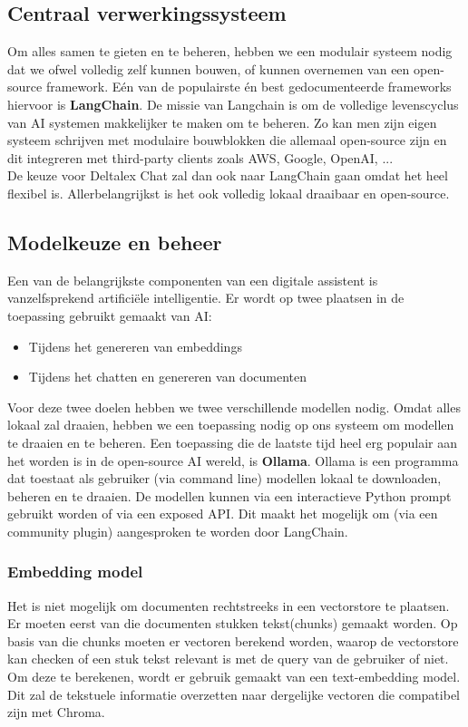 \subsection{Centraal verwerkingssysteem}
Om alles samen te gieten en te beheren, hebben we een modulair systeem nodig dat we ofwel volledig zelf kunnen bouwen, of kunnen overnemen van een open-source framework. 
Eén van de populairste én best gedocumenteerde frameworks hiervoor is \textbf{LangChain}. 
De missie van Langchain is om de volledige levenscyclus van AI systemen makkelijker te maken om te beheren. 
Zo kan men zijn eigen systeem schrijven met modulaire bouwblokken die allemaal open-source zijn en dit integreren met third-party clients zoals AWS, Google, OpenAI, ... \\ 

De keuze voor Deltalex Chat zal dan ook naar LangChain gaan omdat het heel flexibel is. 
Allerbelangrijkst is het ook volledig lokaal draaibaar en open-source. 

\newpage
\subsection{Modelkeuze en beheer}
Een van de belangrijkste componenten van een digitale assistent is vanzelfsprekend artificiële intelligentie. 
Er wordt op twee plaatsen in de toepassing gebruikt gemaakt van AI: 

\begin{itemize}
	\item Tijdens het genereren van embeddings
	\item Tijdens het chatten en genereren van documenten
\end{itemize}

Voor deze twee doelen hebben we twee verschillende modellen nodig. 
Omdat alles lokaal zal draaien, hebben we een toepassing nodig op ons systeem om modellen te draaien en te beheren. 
Een toepassing die de laatste tijd heel erg populair aan het worden is in de open-source AI wereld, is \textbf{Ollama}. 
Ollama is een programma dat toestaat als gebruiker (via command line) modellen lokaal te downloaden, beheren en te draaien. 
De modellen kunnen via een interactieve Python prompt gebruikt worden of via een exposed API. 
Dit maakt het mogelijk om (via een community plugin) aangesproken te worden door LangChain. 

\subsubsection{Embedding model}
Het is niet mogelijk om documenten rechtstreeks in een vectorstore te plaatsen. 
Er moeten eerst van die documenten stukken tekst(chunks) gemaakt worden. 
Op basis van die chunks moeten er vectoren berekend worden, waarop de vectorstore kan checken of een stuk tekst relevant is met de query van de gebruiker of niet. 
Om deze te berekenen, wordt er gebruik gemaakt van een text-embedding model. 
Dit zal de tekstuele informatie overzetten naar dergelijke vectoren die compatibel zijn met Chroma. \\

